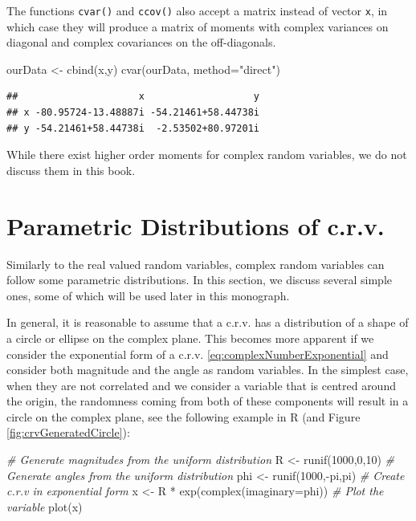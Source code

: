 \documentclass[
]{book}
\newenvironment{Shaded}{\begin{snugshade}}{\end{snugshade}}
\newcommand{\AttributeTok}[1]{\textcolor[rgb]{0.77,0.63,0.00}{#1}}
\newcommand{\CommentTok}[1]{\textcolor[rgb]{0.56,0.35,0.01}{\textit{#1}}}
\newcommand{\DecValTok}[1]{\textcolor[rgb]{0.00,0.00,0.81}{#1}}
\newcommand{\FunctionTok}[1]{\textcolor[rgb]{0.00,0.00,0.00}{#1}}
\newcommand{\NormalTok}[1]{#1}
\newcommand{\OtherTok}[1]{\textcolor[rgb]{0.56,0.35,0.01}{#1}}
\newcommand{\SpecialCharTok}[1]{\textcolor[rgb]{0.00,0.00,0.00}{#1}}
\newcommand{\StringTok}[1]{\textcolor[rgb]{0.31,0.60,0.02}{#1}}
\begin{document}
The functions \texttt{cvar()} and \texttt{ccov()} also accept a matrix instead of vector \texttt{x}, in which case they will produce a matrix of moments with complex variances on diagonal and complex covariances on the off-diagonals.

\begin{Shaded}
\begin{Highlighting}[]
\NormalTok{ourData }\OtherTok{\textless{}{-}} \FunctionTok{cbind}\NormalTok{(x,y)}
\FunctionTok{cvar}\NormalTok{(ourData, }\AttributeTok{method=}\StringTok{"direct"}\NormalTok{)}
\end{Highlighting}
\end{Shaded}

\begin{verbatim}
##                     x                   y
## x -80.95724-13.48887i -54.21461+58.44738i
## y -54.21461+58.44738i  -2.53502+80.97201i
\end{verbatim}

While there exist higher order moments for complex random variables, we do not discuss them in this book.

\hypertarget{parametric-distributions-of-c.r.v.}{%
\section{Parametric Distributions of c.r.v.}\label{parametric-distributions-of-c.r.v.}}

Similarly to the real valued random variables, complex random variables can follow some parametric distributions. In this section, we discuss several simple ones, some of which will be used later in this monograph.

In general, it is reasonable to assume that a c.r.v. has a distribution of a shape of a circle or ellipse on the complex plane. This becomes more apparent if we consider the exponential form of a c.r.v. \eqref{eq:complexNumberExponential} and consider both magnitude and the angle as random variables. In the simplest case, when they are not correlated and we consider a variable that is centred around the origin, the randomness coming from both of these components will result in a circle on the complex plane, see the following example in R (and Figure \ref{fig:crvGeneratedCircle}):

\begin{Shaded}
\begin{Highlighting}[]
\CommentTok{\# Generate magnitudes from the uniform distribution}
\NormalTok{R }\OtherTok{\textless{}{-}} \FunctionTok{runif}\NormalTok{(}\DecValTok{1000}\NormalTok{,}\DecValTok{0}\NormalTok{,}\DecValTok{10}\NormalTok{)}
\CommentTok{\# Generate angles from the uniform distribution}
\NormalTok{phi }\OtherTok{\textless{}{-}} \FunctionTok{runif}\NormalTok{(}\DecValTok{1000}\NormalTok{,}\SpecialCharTok{{-}}\NormalTok{pi,pi)}
\CommentTok{\# Create c.r.v in exponential form}
\NormalTok{x }\OtherTok{\textless{}{-}}\NormalTok{ R }\SpecialCharTok{*} \FunctionTok{exp}\NormalTok{(}\FunctionTok{complex}\NormalTok{(}\AttributeTok{imaginary=}\NormalTok{phi))}
\CommentTok{\# Plot the variable}
\FunctionTok{plot}\NormalTok{(x)}
\end{Highlighting}
\end{Shaded}
\end{document}
